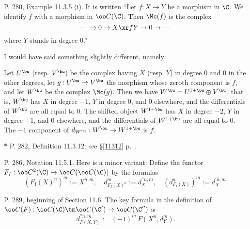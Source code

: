 \documentclass[12pt]{article}
\theoremstyle{remark}
\theoremstyle{definition}
\begin{document}
\begin{s}
P. 280, Example 11.3.5 (i). It is written ``Let $f:X\to Y$ be a morphism in $\C$. We identify $f$ with a morphism in $\oo C(\C)$. Then $\Mc(f)$ is the complex 
$$
\cdots\to0\to X\xr fY\to0\to\cdots
$$ 
where $Y$ stands in degree 0.'' 

I would have said something slightly different, namely:

Let $U^\bu$ (resp. $V^\bu$) be the complex having $X$ (resp. $Y$) in degree 0 and 0 in the other degrees, let $g:U^\bu\to V^\bu$ the morphism whose zeroth component is $f$, and let $W^\bu$ be the complex $\Mc(g)$. Then we have $W^\bu=U^{1+\bu}\oplus V^\bu$, that is, $W^\bu$ has $X$ in degree $-1$, $Y$ in degree 0, and 0 elsewhere, and the differentials of $W^\bu$ are all equal to 0. The shifted object $W^{1+\bu}$ has $X$ in degree $-2$, $Y$ in degree $-1$, and 0 elsewhere, and the differentials of $W^{1+\bu}$ are all equal to 0. The $-1$ component of $d_{W^\bu}:W^\bu\to W^{1+\bu}$ is $f$.
\end{s}

%

\nn$*$ P. 282, Definition 11.3.12: see \S\ref{11312} p.~.

%

\begin{s}
P. 286, Notation 11.5.1. Here is a minor variant: Define the functor $F_I:\oo C^2(\C)\to\oo C(\oo C(\C))$ by the formulas 
$$
(F_I(X)^n)^m:=X^{n,m},\quad d^m_{F_I(X)^n}:=d_X^{''n,m},\quad(d^n_{F_I(X)})^m:=d_X^{'n,m}.
$$
\end{s}

%

\begin{s}
P. 289, beginning of Section 11.6. The key formula in the definition of $\oo C(F):\oo C(\C)\tm\oo C(\C')\to\oo C(\C'')$ is 
$$
d_{F(X,Y)}^{''n,m}:=(-1)^m\,F(X^n,d_Y^m).
$$
\end{s}

%
\end{document}
